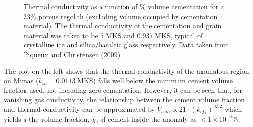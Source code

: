 \documentclass[11pt]{article} %
\begin{document}
	\begin{figure}[h]
	\centering
		\caption{Thermal conductivity as a function of \% volume cementation for a 33\% porous regolith (excluding volume occupied by cementation material). The thermal conductivity of the cementation and grain material was taken to be 6 MKS and 0.937 MKS, typical of crystalline ice and silica/basaltic glass respectively. Data taken from Piqueux and Christensen (2009)}
	\end{figure}

	The plot on the left shows that the thermal conductivity of the anomalous region on Mimas ($k_{in} = 0.0113$ MKS) falls well below the minimum cement volume fraction used, not including zero cementation. However, it can be seen that, for vanishing gas conductivity,  the relationship between the cement volume fraction and thermal conductivity can be approximated by $V_{cem} \varpropto 21\cdot (k_{eff})^{3.32}$ which yields a the volume fraction, $\chi$, of cement inside the anomaly as $<1\times10^{-6} \%$.
	
\end{document}
